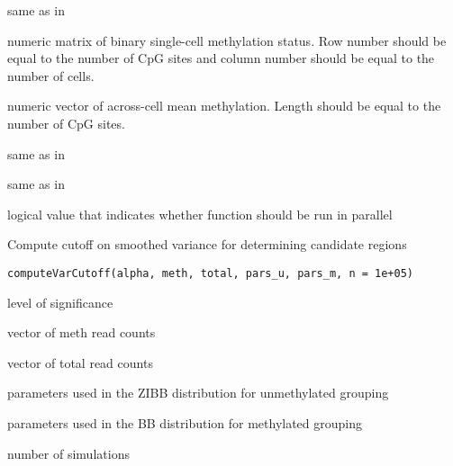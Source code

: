 \documentclass[letterpaper]{book}
\begin{document}
\begin{Arguments}
\begin{ldescription}
\item[\code{gr}] same as in 

\item[\code{M}] numeric matrix of binary single-cell methylation status. Row number
should be equal to the number of CpG sites and column number should be equal
to the number of cells.

\item[\code{meanMeth}] numeric vector of across-cell mean methylation. Length should
be equal to the number of CpG sites.

\item[\code{bpWindow}] same as in 

\item[\code{sparseNAdrop}] same as in 

\item[\code{parallel}] logical value that indicates whether function should be
run in parallel
\end{ldescription}
\end{Arguments}
%
\begin{Description}
Compute cutoff on smoothed variance for determining candidate regions
\end{Description}
%
\begin{Usage}
\begin{verbatim}
computeVarCutoff(alpha, meth, total, pars_u, pars_m, n = 1e+05)
\end{verbatim}
\end{Usage}
%
\begin{Arguments}
\begin{ldescription}
\item[\code{alpha}] level of significance

\item[\code{meth}] vector of meth read counts

\item[\code{total}] vector of total read counts

\item[\code{pars\_u}] parameters used in the ZIBB distribution for unmethylated grouping

\item[\code{pars\_m}] parameters used in the BB distribution for methylated grouping

\item[\code{n}] number of simulations
\end{ldescription}
\end{Arguments}
\end{document}

